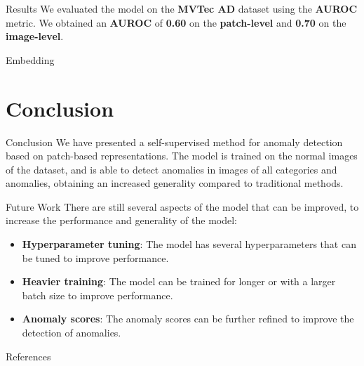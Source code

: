 \documentclass{beamer}
\begin{document}
\begin{frame}{Results}
      We evaluated the model on the \textbf{MVTec AD} dataset using the \textbf{AUROC} metric.
      We obtained an \textbf{AUROC} of \textbf{0.60} on the \textbf{patch-level} and \textbf{0.70} 
      on the \textbf{image-level}.
\end{frame}
\begin{frame}{Embedding}
\end{frame}
\section{Conclusion}

\begin{frame}{Conclusion}
      We have presented a self-supervised method for anomaly detection based
 on patch-based representations. The model is trained on the normal images
  of the dataset, and is able to detect 
  anomalies in images of all categories and anomalies, obtaining an increased 
  generality compared to traditional methods.
\end{frame}
\begin{frame}{Future Work}
      There are still several aspects of the model that can be improved, to 
      increase the performance and generality of the model:
      \begin{itemize}
              \item \textbf{Hyperparameter tuning}: The model has several hyperparameters
               that can be tuned to improve performance.
              \item \textbf{Heavier training}: The model can be trained for longer
               or with a larger batch size to improve performance.
               \item \textbf{Anomaly scores}: The anomaly scores can be further refined
                to improve the detection of anomalies.
                \end{itemize}
\end{frame}
\begin{frame}{References}
\end{frame}



\backmatter
\end{document}
